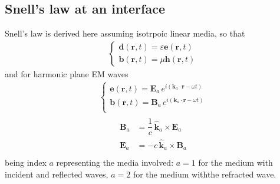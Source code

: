 \documentclass[letterpaper,10pt,italian]{jupyterBook}
\begin{document}
\subsection{Snell’s law at an interface}
\label{\detokenize{ch/waves-plane:snell-s-law-at-an-interface}}\label{\detokenize{ch/waves-plane:classical-electromagnetism-waves-plane-waves-snell}}
\sphinxAtStartPar
Snell’s law is derived here assuming isotrpoic linear media, so that
\begin{equation*}
\begin{split}\begin{cases}
  \mathbf{d}(\mathbf{r},t) = \varepsilon \mathbf{e}(\mathbf{r},t) \\
  \mathbf{b}(\mathbf{r},t) = \mu         \mathbf{h}(\mathbf{r},t)
\end{cases}\end{split}
\end{equation*}
\sphinxAtStartPar
and for harmonic plane EM waves
\begin{equation*}
\begin{split}\begin{cases}
 \mathbf{e}(\mathbf{r}, t) = \mathbf{E}_{a} \, e^{i \left( \mathbf{k}_a \cdot \mathbf{r} - \omega t \right)} \\
 \mathbf{b}(\mathbf{r}, t) = \mathbf{B}_{a} \, e^{i \left( \mathbf{k}_a \cdot \mathbf{r} - \omega t \right)} \\
\end{cases}\end{split}
\end{equation*}\begin{equation*}
\begin{split}\begin{aligned}
  \mathbf{B}_a & = \dfrac{1}{c} \, \hat{\mathbf{k}}_a \times \mathbf{E}_a \\
  \mathbf{E}_a & = - c \, \hat{\mathbf{k}}_a \times \mathbf{B}_a \\
\end{aligned}\end{split}
\end{equation*}
\sphinxAtStartPar
being index \(a\) representing the media involved: \(a = 1\) for the medium with incident and reflected waves, \(a = 2\) for the medium withthe refracted wave.
\end{document}
